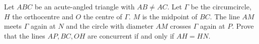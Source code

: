 Let $ABC$ be an acute-angled triangle with $AB\not= AC$. Let $\Gamma$ be the circumcircle, $H$ the orthocentre and $O$ the centre of $\Gamma$. $M$ is the midpoint of $BC$. The line $AM$ meets $\Gamma$ again at $N$ and the circle with diameter $AM$ crosses $\Gamma$ again at $P$. Prove that the lines $AP,BC,OH$ are concurrent if and only if $AH=HN$.